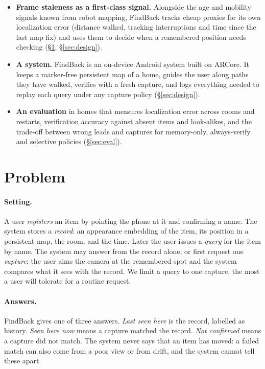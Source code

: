 \documentclass[sigconf,10pt]{acmart}
\newcommand{\sys}{FindBack}
\begin{document}
\begin{itemize}
\item \textbf{Frame staleness as a first-class signal.} Alongside the age and mobility signals
  known from robot mapping, \sys{} tracks cheap proxies for its own localization error (distance
  walked, tracking interruptions and time since the last map fix) and uses them to decide when a
  remembered position needs checking (\S\ref{sec:problem}, \S\ref{sec:design}).
\item \textbf{A system.} \sys{} is an on-device Android system built on ARCore.
  It keeps a marker-free persistent map of a home, guides the user along paths they have walked,
  verifies with a fresh capture, and logs everything needed to replay each query under any
  capture policy (\S\ref{sec:design}).
\item \textbf{An evaluation} in \NSites{} homes that measures localization error across rooms and
  restarts, verification accuracy against absent items and look-alikes, and the trade-off between
  wrong leads and captures for memory-only, always-verify and selective policies
  (\S\ref{sec:eval}).
\end{itemize}

\section{Problem}
\label{sec:problem}

\paragraph{Setting.}
A user \emph{registers} an item by pointing the phone at it and confirming a name.
The system stores a \emph{record}: an appearance embedding of the item, its position in a
persistent map, the room, and the time.
Later the user issues a \emph{query} for the item by name.
The system may answer from the record alone, or first request one \emph{capture}: the user aims the
camera at the remembered spot and the system compares what it sees with the record.
We limit a query to one capture, the most a user will tolerate for a routine request.

\paragraph{Answers.}
\sys{} gives one of three answers.
\emph{Last seen here} is the record, labelled as history.
\emph{Seen here now} means a capture matched the record.
\emph{Not confirmed} means a capture did not match.
The system never says that an item has moved: a failed match can also come from a poor view or
from drift, and the system cannot tell these apart.
\end{document}
